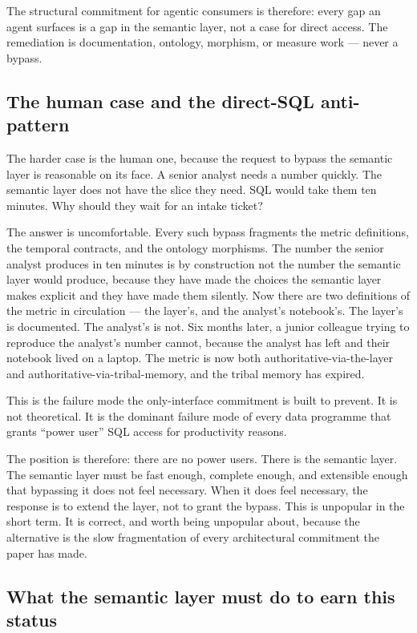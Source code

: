\documentclass[11pt,a4paper]{article}
\begin{document}
The structural commitment for agentic consumers is therefore: every gap an agent surfaces is a gap in the semantic layer, not a case for direct access. The remediation is documentation, ontology, morphism, or measure work --- never a bypass.

\subsection{The human case and the direct-SQL anti-pattern}

The harder case is the human one, because the request to bypass the semantic layer is reasonable on its face. A senior analyst needs a number quickly. The semantic layer does not have the slice they need. SQL would take them ten minutes. Why should they wait for an intake ticket?

The answer is uncomfortable. Every such bypass fragments the metric definitions, the temporal contracts, and the ontology morphisms. The number the senior analyst produces in ten minutes is by construction not the number the semantic layer would produce, because they have made the choices the semantic layer makes explicit and they have made them silently. Now there are two definitions of the metric in circulation --- the layer's, and the analyst's notebook's. The layer's is documented. The analyst's is not. Six months later, a junior colleague trying to reproduce the analyst's number cannot, because the analyst has left and their notebook lived on a laptop. The metric is now both authoritative-via-the-layer and authoritative-via-tribal-memory, and the tribal memory has expired.

This is the failure mode the only-interface commitment is built to prevent. It is not theoretical. It is the dominant failure mode of every data programme that grants ``power user'' SQL access for productivity reasons.

The position is therefore: there are no power users. There is the semantic layer. The semantic layer must be fast enough, complete enough, and extensible enough that bypassing it does not feel necessary. When it does feel necessary, the response is to extend the layer, not to grant the bypass. This is unpopular in the short term. It is correct, and worth being unpopular about, because the alternative is the slow fragmentation of every architectural commitment the paper has made.

\subsection{What the semantic layer must do to earn this status}
\end{document}
